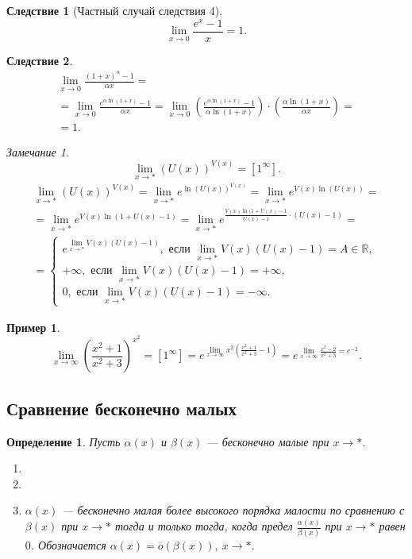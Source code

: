 \documentclass[a4paper,12pt]{article} %
\newtheorem{definition}{Определение}[section]
\newtheorem{corollary}{Следствие}[theorem]
\theoremstyle{remark}
\newtheorem*{remark}{Замечание}
\theoremstyle{definition}
\newtheorem{exmp}{Пример}[section]
\begin{document}
\begin{corollary}[Частный случай следствия 4]
	\[
	\lim_{x \to 0} \frac{e^{x}-1}{x} = 1
	.\] 
\end{corollary}
\begin{corollary}
	\begin{multline}
		\lim_{x \to 0} \frac{(1+x)^{\alpha} - 1}{\alpha x} = \\
		= \lim_{x \to 0} \frac{e^{\alpha \ln(1+x)} - 1}{\alpha x} = \lim_{x \to 0} \left(\frac{e^{\alpha \ln(1+x)} - 1}{\alpha \ln(1+x)}\right) \cdot \left(\frac{\alpha \ln(1+x)}{\alpha x}\right) = \\
		= 1.
	\end{multline}
\end{corollary}
\begin{remark}
	\[
		\lim_{x \to *} (U(x))^{V(x)} = [1^{\infty}]
	.\] 	
	\begin{multline}
		\lim_{x \to *} (U(x))^{V(x)} = \lim_{x \to *}  e^{\ln(U(x))^{V(x)}} = \lim_{x \to *} e^{V(x)\ln(U(x))} = \\
		= \lim_{x \to *} e^{V(x)\ln(1 + U(x) - 1)} = \lim_{x \to *} e^{\frac{V(x)\ln(1 + U(x) - 1}{U(x) - 1}\cdot (U(x) - 1)} = \\
		= \begin{cases}
			e^{\lim_{x \to *} V(x)(U(x) - 1)}, \text{ если } \lim_{x \to *} V(x)(U(x) - 1) = A\in \mathbb{R}, \\
			+\infty, \text{ если } \lim_{x \to *} V(x)(U(x) - 1) = +\infty, \\
			0, \text{ если } \lim_{x \to *} V(x)(U(x)-1) = -\infty.
		\end{cases}
	\end{multline}
\end{remark}
\begin{exmp}
	\[	
		\lim_{x \to \infty} \left(\frac{x^2 + 1}{x^2 + 3}\right)^{x^2} = [1^{\infty}] = e^{\lim_{x \to \infty} x^2 \left(\frac{x^2 + 1}{x^2 + 3} - 1\right)} = e^{\lim_{x \to \infty} \frac{x^2-2}{x^2 + 3} = e^{-2}}
	.\] 
\end{exmp}



\subsection{Сравнение бесконечно малых}
\begin{definition}
	Пусть $\alpha(x)$ и $\beta(x)$ --- бесконечно малые при $x\to *$.
	\begin{enumerate}
		\item 
		\item
		\item $\alpha(x)$ --- бесконечно малая более высокого порядка малости по сравнению с $\beta(x)$ при $x\to *$ тогда и только тогда, когда предел $\frac{\alpha(x)}{\beta(x)}$ при $x\to *$ равен $0$. Обозначается $\alpha(x) = \overline{o}(\beta(x)), \ x \to *$.
	\end{enumerate}
\end{definition}
\end{document}

